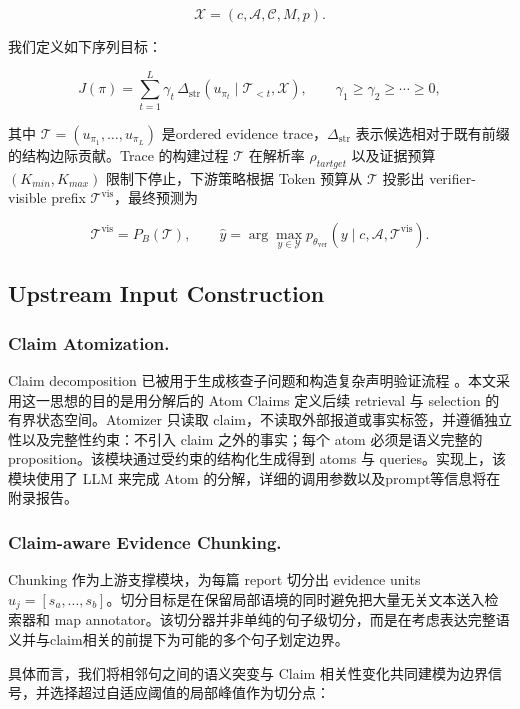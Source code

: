 \documentclass[letterpaper]{article}
\begin{document}
\[
\mathcal X=(c,\mathcal A,\mathcal C,M,p).
\]

我们定义如下序列目标：

\[
J(\pi)
=\sum_{t=1}^{L}\gamma_t\,
\Delta_{\mathrm{str}}\!\left(u_{\pi_t}\mid \mathcal T_{<t},\mathcal X\right),
\qquad \gamma_1\ge\gamma_2\ge\cdots\ge 0,
\]

其中 $\mathcal T=(u_{\pi_1},\ldots,u_{\pi_L})$ 是ordered evidence trace，$\Delta_{\mathrm{str}}$ 表示候选相对于既有前缀的结构边际贡献。Trace 的构建过程 $\mathcal T$ 在解析率 $\rho_{tartget}$ 以及证据预算 $(K_{min}, K_{max})$ 限制下停止，下游策略根据 Token 预算从 $\mathcal T$ 投影出 verifier-visible prefix $\mathcal T^{\mathrm{vis}}$，最终预测为

\[
\mathcal T^{\mathrm{vis}}=P_B(\mathcal T),
\qquad
\hat y=\arg\max_{y\in\mathcal Y}
p_{\theta_{\mathrm{ver}}}(y\mid c,\mathcal A,\mathcal T^{\mathrm{vis}}).
\]

\subsection{Upstream Input Construction}

\subsubsection{Claim Atomization.}

Claim decomposition 已被用于生成核查子问题和构造复杂声明验证流程 \citep{Chen2022ClaimDecomp,Pan2023ProgramFC,Chen2023WildEvidence}。本文采用这一思想的目的是用分解后的 Atom Claims 定义后续 retrieval 与 selection 的有界状态空间。Atomizer 只读取 claim，不读取外部报道或事实标签，并遵循独立性以及完整性约束：不引入 claim 之外的事实；每个 atom 必须是语义完整的 proposition。该模块通过受约束的结构化生成得到 atoms 与 queries。实现上，该模块使用了 LLM 来完成 Atom 的分解，详细的调用参数以及prompt等信息将在附录报告。

\subsubsection{Claim-aware Evidence Chunking.}

Chunking 作为上游支撑模块，为每篇 report 切分出 evidence units $u_j=[s_a,\ldots,s_b]$。切分目标是在保留局部语境的同时避免把大量无关文本送入检索器和 map annotator。该切分器并非单纯的句子级切分，而是在考虑表达完整语义并与claim相关的前提下为可能的多个句子划定边界。

具体而言，我们将相邻句之间的语义突变与 Claim 相关性变化共同建模为边界信号，并选择超过自适应阈值的局部峰值作为切分点：
\end{document}
